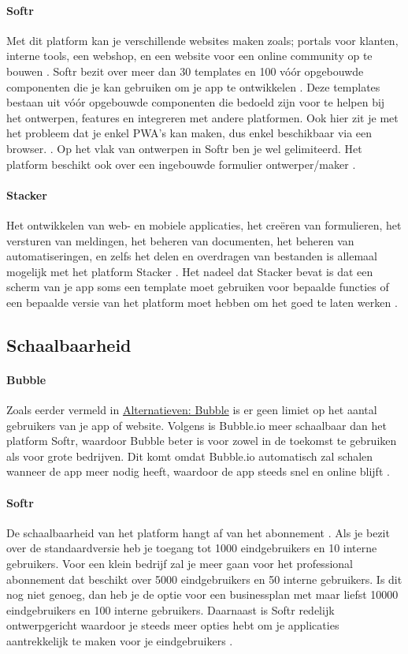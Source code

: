 \paragraph{Softr}
Met dit platform kan je verschillende websites maken zoals; portals voor klanten, interne tools, een webshop, en een website voor een online community op te bouwen\autocite{Code2023} \autocite{Youssef2023} .
Softr bezit over meer dan 30 templates en 100 vóór opgebouwde componenten die je kan gebruiken om je app te 
ontwikkelen \autocite{Frater2024} \autocite{Youssef2023}. 
Deze templates bestaan uit vóór opgebouwde componenten die bedoeld zijn voor te helpen bij het ontwerpen, features en integreren met andere platformen. 
Ook hier zit je met het probleem dat je enkel PWA’s kan maken, dus enkel beschikbaar via een browser. \autocite{Frater2024}. 
Op het vlak van ontwerpen in Softr ben je wel gelimiteerd. Het platform beschikt ook over een ingebouwde formulier ontwerper/maker \autocite{Youssef2023}. 

\paragraph{Stacker}
Het ontwikkelen van web- en mobiele applicaties, het creëren van formulieren, het versturen van meldingen, het beheren van documenten, 
het beheren van automatiseringen, en zelfs het delen en overdragen van bestanden is allemaal mogelijk met het platform 
Stacker \autocite{JDN2023}. 
Het nadeel dat Stacker bevat is dat een scherm van je app soms een template moet gebruiken voor bepaalde functies 
of een bepaalde versie van het platform moet hebben om het goed te laten werken \autocite{Advice}.
\subsection{Schaalbaarheid}%
\label{subsec:schaalbaarheid}
\paragraph{Bubble}
Zoals eerder vermeld in \hyperref[subsec:alternatieve-platformen]{Alternatieven: Bubble} is er geen limiet op het aantal gebruikers van je app of website. Volgens \textcite{Youssef2023} is 
Bubble.io meer schaalbaar dan het platform Softr, waardoor Bubble beter is voor zowel in de toekomst te gebruiken als voor grote bedrijven. 
Dit komt omdat Bubble.io automatisch zal schalen wanneer de app meer nodig heeft, 
waardoor de app steeds snel en online blijft \autocite{Bas2024}.
\paragraph{Softr}
De schaalbaarheid van het platform hangt af van het abonnement \autocite{Frater2024}. 
Als je bezit over de standaardversie heb je toegang tot 1000 eindgebruikers en 10 interne gebruikers. 
Voor een klein bedrijf zal je meer gaan voor het professional abonnement dat beschikt over 5000 eindgebruikers en 50 interne gebruikers. Is dit nog niet genoeg, 
dan heb je de optie voor een businessplan met maar liefst 10000 eindgebruikers en 100 interne gebruikers. Daarnaast is Softr redelijk ontwerpgericht waardoor je steeds 
meer opties hebt om je applicaties aantrekkelijk te maken voor je eindgebruikers \autocite{Noloco2023}.
